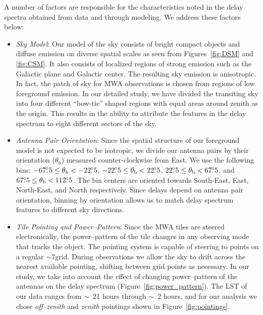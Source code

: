 \documentclass[preprint2,iop,numberedappendix]{emulateapj}
\begin{document}
A number of factors are responsible for the characteristics noted in the delay spectra obtained from data and through modeling. We address these factors below:
\begin{itemize}

\item {\it Sky Model}: Our model of the sky consists of bright compact objects and diffuse emission on diverse spatial scales as seen from Figures~\ref{fig:DSM} and \ref{fig:CSM}. It also consists of localized regions of strong emission such as the Galactic plane and Galactic center. The resulting sky emission is anisotropic. In fact, the patch of sky for MWA observations is chosen from regions of low foreground emission. In our detailed study, we have divided the transiting sky into four different ``bow-tie'' shaped regions with equal areas around zenith as the origin. This results in the ability to attribute the features in the delay spectrum to eight different sectors of the sky. %

\item {\it Antenna Pair Orientation}: Since the spatial structure of our foreground model is not expected to be isotropic, we divide our antenna pairs by their orientation ($\theta_\textrm{b}$) measured counter-clockwise from East. We use the following bins: $-67\mbox{$.\!\!^\circ$} 5\le \theta_\textrm{b} < -22\mbox{$.\!\!^\circ$} 5$, $-22\mbox{$.\!\!^\circ$} 5\le \theta_\textrm{b} < 22\mbox{$.\!\!^\circ$} 5$, $22\mbox{$.\!\!^\circ$} 5\le \theta_\textrm{b} < 67\mbox{$.\!\!^\circ$} 5$, and $67\mbox{$.\!\!^\circ$} 5\le \theta_\textrm{b} < 112\mbox{$.\!\!^\circ$} 5$. The bin centers are oriented towards South-East, East, North-East, and North respectively. Since delays depend on antenna pair orientation, binning by orientation allows us to match delay spectrum features to different sky directions.

\item {\it Tile Pointing and Power--Pattern}: Since the MWA tiles are steered electronically, the power--pattern of the tile changes in any observing mode that tracks the object. The pointing system is capable of steering to points on a regular $\sim$7\arcdeg grid. During observations we allow the sky to drift across the nearest available pointing, shifting between grid points as necessary. In our study, we take into account the effect of changing power--pattern of the antennas on the delay spectrum (Figure~\ref{fig:power_pattern}). The LST of our data ranges from $\sim$~21 hours through $\sim$~2 hours, and for our analysis we chose {\it off--zenith} and {\it zenith} pointings shown in Figure~\ref{fig:pointings}. 


\end{itemize}
\end{document}
